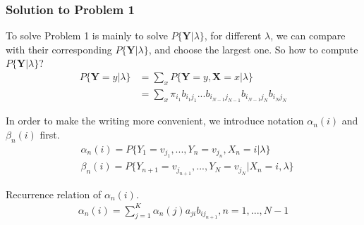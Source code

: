 \documentclass[runningheads]{llncs}
\begin{document}
\subsubsection{Solution to Problem 1}
To solve Problem 1 is mainly to solve $P \{ \mathbf{Y} | \lambda \} $,
for different $\lambda$, we can compare with their corresponding
$P \{ \mathbf{Y} | \lambda \} $, and choose the largest one.
So how to compute $P \{ \mathbf{Y} | \lambda \} $?
\begin{align}
    P \{ \mathbf{Y} = y | \lambda \}
    &= \sum_x P \{ \mathbf{Y} = y, \mathbf{X} = x | \lambda \} \\
    &= \sum_x \pi_{i_1} b_{i_1 j_1}... b_{i_{N-1} j_{N-1}} b_{i_{N-1} j_{N}} b_{i_{N} j_{N}}
\end{align}
\par
In order to make the writing more convenient, we introduce notation
$\alpha_n(i)$ and $\beta_n(i)$ first.
\begin{align}
    &\alpha_n(i) = P \{ Y_1 = v_{j_1},..., Y_n = v_{j_n}, X_n = i | \lambda \} \\
    &\beta_n(i) = P \{ Y_{n+1} = v_{j_{n+1}},...,Y_N = v_{j_N} | X_n = i, \lambda \}
\end{align}
\par
Recurrence relation of $\alpha_n(i)$.
\begin{align}
    \alpha_n(i) = \sum_{j=1}^K \alpha_n(j) a_{ji} b_{ij_{n+1}}, n = 1,..., N - 1
\end{align}
\end{document}
